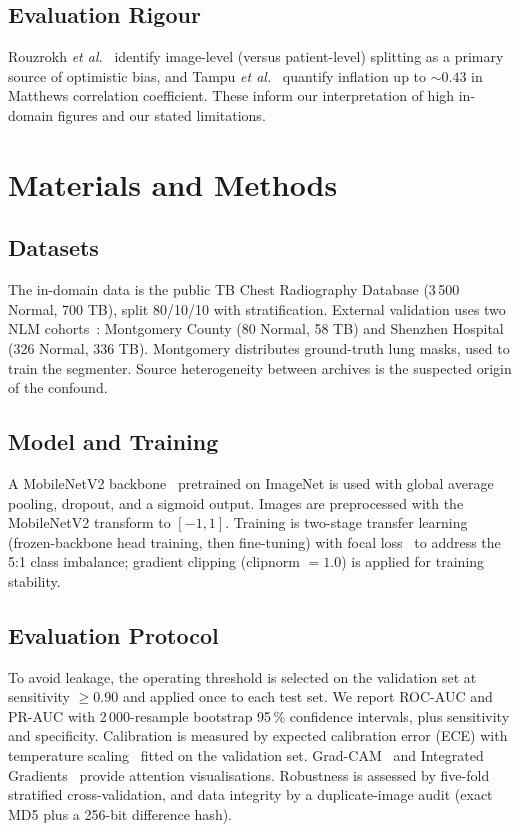 \documentclass[journal]{IEEEtran}
\begin{document}
\subsection{Evaluation Rigour}
Rouzrokh \emph{et al.}~\cite{rouzrokh2022mitigating} identify image-level
(versus patient-level) splitting as a primary source of optimistic bias, and
Tampu \emph{et al.}~\cite{tampu2022inflation} quantify inflation up to
${\sim}0.43$ in Matthews correlation coefficient. These inform our
interpretation of high in-domain figures and our stated limitations.

\section{Materials and Methods}

\subsection{Datasets}
The in-domain data is the public TB Chest Radiography Database (3\,500 Normal,
700 TB), split 80/10/10 with stratification. External validation uses two NLM
cohorts~\cite{jaeger2014two}: Montgomery County (80 Normal, 58 TB) and Shenzhen
Hospital (326 Normal, 336 TB). Montgomery distributes ground-truth lung masks,
used to train the segmenter. Source heterogeneity between archives is the
suspected origin of the confound.

\subsection{Model and Training}
A MobileNetV2 backbone~\cite{sandler2018mobilenetv2} pretrained on ImageNet is
used with global average pooling, dropout, and a sigmoid output. Images are
preprocessed with the MobileNetV2 transform to $[-1, 1]$. Training is two-stage
transfer learning (frozen-backbone head training, then fine-tuning) with focal
loss~\cite{lin2017focal} to address the 5:1 class imbalance; gradient clipping
(clipnorm $= 1.0$) is applied for training stability.

\subsection{Evaluation Protocol}
To avoid leakage, the operating threshold is selected on the validation set at
sensitivity $\geq 0.90$ and applied once to each test set. We report ROC-AUC
and PR-AUC with 2\,000-resample bootstrap 95\,\% confidence intervals, plus
sensitivity and specificity. Calibration is measured by expected calibration
error (ECE) with temperature scaling~\cite{guo2017calibration} fitted on the
validation set. Grad-CAM~\cite{selvaraju2017gradcam} and Integrated
Gradients~\cite{sundararajan2017axiomatic} provide attention visualisations.
Robustness is assessed by five-fold stratified cross-validation, and data
integrity by a duplicate-image audit (exact MD5 plus a 256-bit difference
hash).
\end{document}
